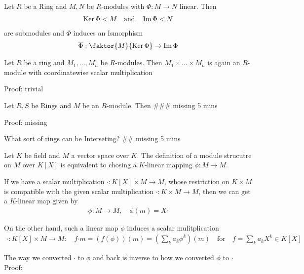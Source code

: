 \begin{proposition}
Let $R$ be a Ring and $M,N$ be $R$-modules with $\Phi: M \to N$ linear. Then
\begin{align*}
	\operatorname{Ker} \Phi < M \quad \text{and} \quad \operatorname{Im} \Phi < N
\end{align*}
are submodules and $\Phi$ induces an Ismorphism
\begin{align*}
	\overline{\Phi}: \faktor{M}{\Ker \Phi} \to \Image \Phi
\end{align*}
\end{proposition}


\begin{lemma}[]
	Let $R$ be a ring and $M_{1}, \ldots, M_{n}$ be $R$-modules. Then $M_{1} \times \dots \times M_{n}$ is again an $R$-module with coordinatewise scalar multiplication
\end{lemma}
Proof: trivial


\begin{lemma}[]
Let $R,S$ be Rings and $M$ be an $R$-module. Then \#\#\# missing 5 mins
\end{lemma}
Proof: missing



What sort of rings can be Interseting? \#\# missing 5 mins



\begin{theorem}[]
	Let $K$ be field and $M$ a vector space over $K$. The definition of a module strucutre on $M$ over $K[X]$ is equivalent to chosing a $K$-linear mapping $\phi:M \to M$.

	If we have a scalar multiplication $\bm{\cdot}: K[X] \times M \to M$, whose restriction on $K \times M$ is compatible with the given scalar multiplication $\cdot: K \times M \to M$, then we can get a $K$-linear map given by
	\begin{align*}
		\phi: M \to M, \quad \phi(m) = X \bm{\cdot} 
	\end{align*}

	On the other hand, such a linear map $\phi$ induces a scalar mulitplication
	\begin{align*}
		\bm{\cdot}: K[X] \times M \to M: \quad f \bm{\cdot} m = (f(\phi))(m) = \left(
			\sum_{k}a_k \phi^{k}
		\right)(m) \quad \text{for} \quad f = \sum_{k}a_kX^{k} \in K[X]
	\end{align*}
\end{theorem}
The way we converted $\bm{\cdot}$ to $\phi$ and back is inverse to how we converted $\phi$ to $\bm{\cdot}$
Proof:

